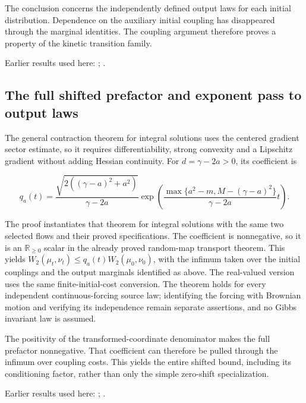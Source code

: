 \documentclass[11pt,a4paper]{report}
\begin{document}
The conclusion concerns the independently defined output laws for each initial distribution. Dependence on the auxiliary initial coupling has disappeared through the marginal identities. The coupling argument therefore proves a property of the kinetic transition family.



Earlier results used here: \cite[Section~3.17.3]{LangevinLean2026ULASC}; \cite[Section~3.17.4]{LangevinLean2026ULASC}.
\subsection{\texorpdfstring{The full shifted prefactor and exponent pass to output laws}{The full shifted prefactor and exponent pass to output laws}}
\label{report-step-KineticLangevin-FlowLaw-lean-7}


The general contraction theorem for integral solutions uses the centered gradient sector estimate, so it requires differentiability, strong convexity and a Lipschitz gradient without adding Hessian continuity. For \(d=\gamma-2a>0\), its coefficient is

\[q_a(t)=\frac{\sqrt{2((\gamma-a)^2+a^2)}}{\gamma-2a}
\exp\!\left(\frac{\max\{a^2-m,M-(\gamma-a)^2\}}{\gamma-2a}t\right).\]

The proof instantiates that theorem for integral solutions with the same two selected flows and their proved specifications. The coefficient is nonnegative, so it is an \(\mathbb R_{\ge0}\) scalar in the already proved random-map transport theorem. This yields \(W_2(\mu_t,\nu_t)\le q_a(t)W_2(\mu_0,\nu_0)\), with the infimum taken over the initial couplings and the output marginals identified as above. The real-valued version uses the same finite-initial-cost conversion. The theorem holds for every independent continuous-forcing source law; identifying the forcing with Brownian motion and verifying its independence remain separate assertions, and no Gibbs invariant law is assumed.



The positivity of the transformed-coordinate denominator makes the full prefactor nonnegative. That coefficient can therefore be pulled through the infimum over coupling costs. This yields the entire shifted bound, including its conditioning factor, rather than only the simple zero-shift specialization.



Earlier results used here: \cite[Section~3.17.3]{LangevinLean2026ULASC}; \cite[Section~3.17.4]{LangevinLean2026ULASC}.
\end{document}
